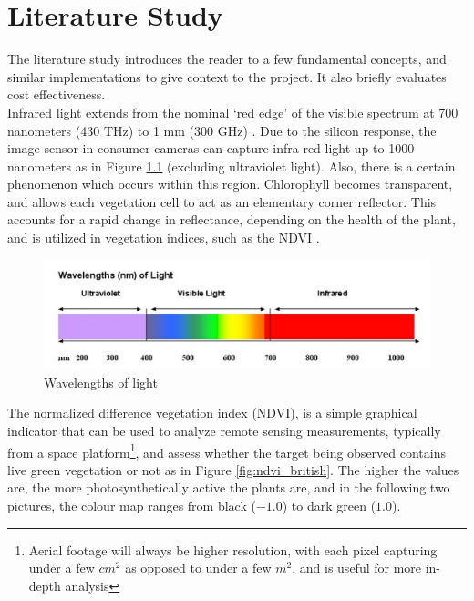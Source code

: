 \chapter{Literature Study}

The literature study introduces the reader to a few fundamental concepts, and similar implementations to give context to the project. It also briefly evaluates cost effectiveness.\\

Infrared light extends from the nominal `red edge' of the visible spectrum at 700 nanometers (430 THz) to 1 mm (300 GHz) \cite{ir_wiki}. Due to the silicon response, the image sensor in consumer cameras can capture infra-red light up to 1000 nanometers \cite{ir_wiki} as in Figure \ref{fig:ir_spectrum} (excluding ultraviolet light). Also, there is a certain phenomenon which occurs within this region. Chlorophyll becomes transparent, and allows each vegetation cell to act as an elementary corner reflector. This accounts for a rapid change in reflectance, depending on the health of the plant, and is utilized in vegetation indices, such as the NDVI \cite{red_edge}.

\begin{figure}[H]
\centering
\includegraphics[scale=0.35]{images/ir_spectrum.png}
\caption{Wavelengths of light \cite{ir_spectrum}}
\label{fig:ir_spectrum}
\end{figure}


The normalized difference vegetation index (NDVI), is a simple graphical indicator that can be used to analyze remote sensing measurements, typically from a space platform\footnote{Aerial footage will always be higher resolution, with each pixel capturing under a few $cm^2$ as opposed to under a few $m^2$, and is useful for more in-depth analysis}, and assess whether the target being observed contains live green vegetation or not\cite{ndvi_wiki} as in Figure \ref{fig:ndvi_british}. The higher the values are, the more photosynthetically active the plants are, and in the following two pictures, the colour map ranges from black ($-1.0$) to dark green ($1.0$).

